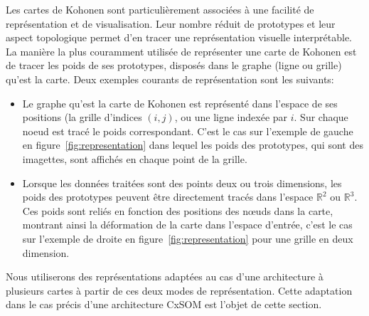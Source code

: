 \documentclass[../main]{subfiles}
\begin{document}
Les cartes de Kohonen sont particulièrement associées à une facilité de représentation et de visualisation. Leur nombre réduit de prototypes et leur aspect topologique permet d'en tracer une représentation visuelle interprétable.
La manière la plus couramment utilisée de représenter une carte de Kohonen est de tracer les poids de ses prototypes, disposés dans le graphe (ligne ou grille) qu'est la carte. Deux exemples courants de représentation sont les suivants: 
\begin{itemize}
\item Le graphe qu'est la carte de Kohonen est représenté dans l'espace de ses positions (la grille d'indices $(i,j)$, ou une ligne indexée par $i$. Sur chaque noeud est tracé le poids correspondant. C'est le cas sur l'exemple de gauche en figure~\ref{fig:representation} dans lequel les poids des prototypes, qui sont des imagettes, sont affichés en chaque point de la grille. 
\item Lorsque les données traitées sont des points deux ou trois dimensions, les poids des prototypes peuvent être directement tracés dans l'espace $\mathbb{R}^2$ ou $\mathbb{R}^3$. Ces poids sont reliés en fonction des positions des n\oe{}uds dans la carte, montrant ainsi la déformation de la carte dans l'espace d'entrée, c'est le cas sur l'exemple de droite en figure~\ref{fig:representation} pour une grille en deux dimension.
\end{itemize}

Nous utiliserons des représentations adaptées au cas d'une architecture à plusieurs cartes à partir de ces deux modes de représentation. 
Cette adaptation dans le cas précis d'une architecture CxSOM est l'objet de cette section.
\end{document}
